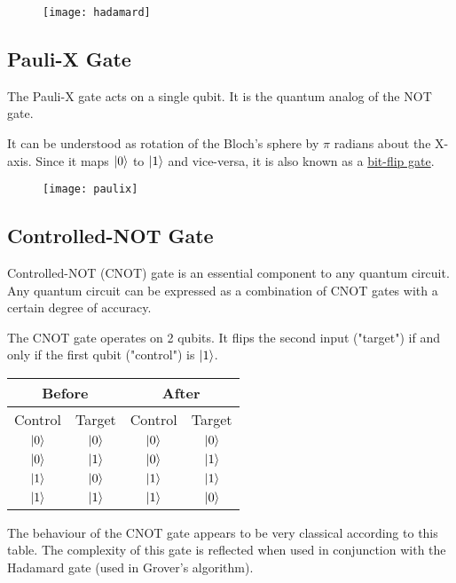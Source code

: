 \documentclass[a4paper]{article}
\begin{document}
\begin{figure}[h]
\texttt{[image: hadamard]}
\centering
\end{figure}

\subsection{ Pauli-X Gate }
The Pauli-X gate acts on a single qubit. It is the quantum analog of the NOT gate. 
\\
\par
It can be understood as rotation of the Bloch's sphere by $\pi$ radians about the X-axis.
Since it maps $\ket{0}$ to $\ket{1}$ and vice-versa, it is also known as a
\underline{bit-flip gate}.


\begin{figure}[h]
\texttt{[image: paulix]}
\centering
\end{figure}

\subsection{ Controlled-NOT Gate }
Controlled-NOT (CNOT) gate is an essential component to any quantum circuit. Any quantum
circuit can be expressed as a combination of CNOT gates with a certain degree of 
accuracy.
\\
\par
\pagebreak
The CNOT gate operates on 2 qubits. It flips the second input ("target") if and only 
if the first qubit ("control") is $\ket{1}$.

\begin{table}[h!]
    \centering
    \begin{tabular}{ |c|c|c|c|  }
        \hline
        \multicolumn{2}{|c}{Before} & \multicolumn{2}{|c|}{After} \\
        \hline
        Control & Target & Control & Target\\
        \hline
        $\ket{0}$ & $\ket{0}$ & $\ket{0}$ & $\ket{0}$ \\
        $\ket{0}$ & $\ket{1}$ & $\ket{0}$ & $\ket{1}$ \\
        $\ket{1}$ & $\ket{0}$ & $\ket{1}$ & $\ket{1}$ \\
        $\ket{1}$ & $\ket{1}$ & $\ket{1}$ & $\ket{0}$ \\
        \hline
    \end{tabular}
\end{table}
The behaviour of the CNOT gate appears to be very classical according to this table. 
The complexity of this gate is reflected when used in conjunction with the Hadamard
gate (used in Grover's algorithm).
\end{document}
